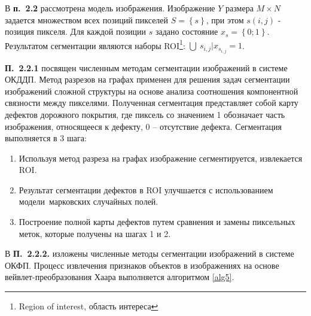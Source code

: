 
В \textbf{п.~2.2} рассмотрена модель изображения. Изображение $Y$ размера $M \times N$ задается множеством всех позиций пикселей $S = \left\{s\right\}$, при этом $s \left(i, j\right)$ - позиция пикселя. Для каждой позиции $s$ задано состояние $x_s=\left\{0;1\right\}$. Результатом сегментации являются наборы ROI\footnote{Region of interest, область интереса}: $\bigcup\ s_{i,j} | x_{s_{i,j}}=1$.

\textbf{П.~2.2.1} посвящен численным методам сегментации изображений в системе ОКДДП. Метод разрезов на графах применен для решения задач сегментации изображений сложной структуры на основе анализа соотношения компонентной связности между пикселями. Полученная сегментация представляет собой карту дефектов дорожного покрытия, где пиксель со значением 1 обозначает часть изображения, относящееся к дефекту, 0 -- отсутствие дефекта. Сегментация выполняется в 3 шага:

\begin{enumerate}[label=\textbf{Шаг~\arabic*.},leftmargin=4em]
\item Используя метод разреза на графах изображение сегментируется, извлекается ROI.
\item Результат сегментации дефектов в ROI улучшается с использованием модели марковских случайных полей.
\item Построение полной карты дефектов путем сравнения и замены пиксельных меток, которые получены на шагах 1 и 2.
\end{enumerate}

В \textbf{П.~2.2.2.} изложены численные методы сегментации изображений в системе ОКФП. Процесс извлечения признаков объектов в изображениях на основе вейвлет-преобразования Хаара выполняется алгоритмом \ref{alg5}.%
%
%
%
%
%
%
%

